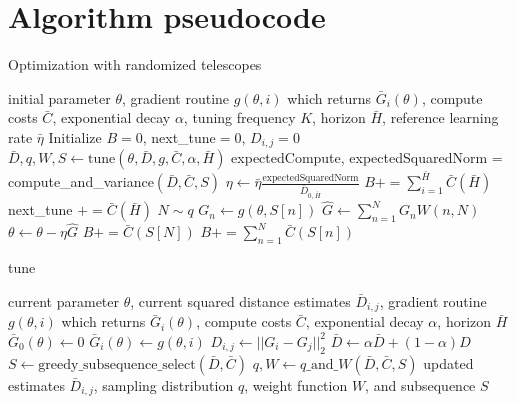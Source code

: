 \section{Algorithm pseudocode}
\begin{algorithm}[H]
   \caption{Optimization with randomized telescopes}
   \label{alg:opt}
\begin{algorithmic}
    initial parameter $\theta$,
   gradient routine $g(\theta, i)$ which returns $\bar{G}_i(\theta)$,
   compute costs $\bar{C}$,
   exponential decay $\alpha$, tuning frequency $K$, horizon $\bar{H}$,
   reference learning rate $\bar{\eta}$
   \STATE Initialize $B = 0$, next\_tune$ = 0$, $D_{i, j} = 0$
   \REPEAT
   \STATE $\bar{D}, q, W, S \leftarrow \text{tune}(
   \theta, \bar{D}, g, \bar{C}, \alpha, \bar{H})$
   \STATE expectedCompute, expectedSquaredNorm = compute\_and\_variance$(\bar{D}, \bar{C}, S)$
   \STATE $\eta \leftarrow \bar{\eta} \frac{\text{expectedSquaredNorm}}{\bar{D}_{0, \bar{H}}}$
   \STATE $B += \sum_{i=1}^{\bar{H}} \bar{C}({\bar{H}})$
   \STATE next\_tune $+= \bar{C}({\bar{H}})$
   \ENDIF
   \STATE $N \sim q$
   \STATE $G_n \leftarrow g(\theta, S[n])$
   \ENDFOR
   \STATE $\hat{G} \leftarrow \sum_{n=1}^N G_n W(n, N)$
   \STATE $\theta \leftarrow \theta - \eta \hat{G}$
   \STATE $B += \bar{C}({S[N]})$
   \ELSE
   \STATE $B += \sum_{n=1}^N \bar{C}({S[n]})$
   \ENDIF
\end{algorithmic}
\end{algorithm}


\begin{algorithm}[H]
   \caption{tune}
   \label{alg:tune}
\begin{algorithmic}
    current parameter $\theta$,
   current squared distance estimates $\bar{D}_{i,j}$,
   gradient routine $g(\theta, i)$ which returns $\bar{G}_i(\theta)$,
   compute costs $\bar{C}$,
   exponential decay $\alpha$, horizon $\bar{H}$
   \STATE $\bar{G}_0(\theta) \leftarrow 0$
   \STATE $\bar{G}_i(\theta) \leftarrow g(\theta, i)$
   \ENDFOR
   \STATE $D_{i, j} \leftarrow ||G_i - G_j||_2^2$
   \ENDFOR
   \ENDFOR
   \STATE $\bar{D} \leftarrow \alpha \bar{D} + (1 - \alpha) D$
   \STATE $S \leftarrow \text{greedy\_subsequence\_select}(\bar{D}, \bar{C})$
   \STATE $q, W \leftarrow \text{$q$\_and\_$W$}(\bar{D}, \bar{C}, S)$
    updated estimates $\bar{D}_{i,j}$,
   sampling distribution $q$, weight function $W$, and subsequence $S$
\end{algorithmic}
\end{algorithm}


